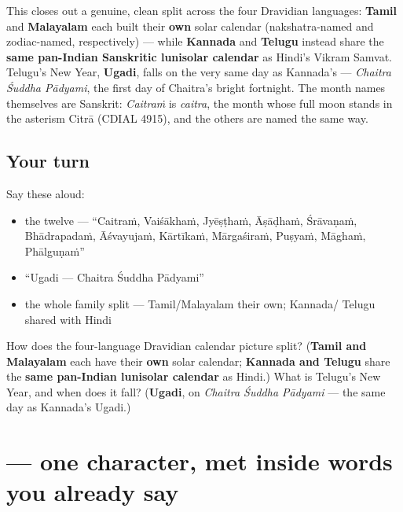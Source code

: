\begin{cousinweb}
This closes out a genuine, clean split across the four Dravidian languages: \textbf{Tamil} and \textbf{Malayalam} each built their \textbf{own} solar calendar (nakshatra-named and zodiac-named, respectively) — while \textbf{Kannada} and \textbf{Telugu} instead share the \textbf{same pan-Indian Sanskritic lunisolar calendar} as Hindi's Vikram Samvat. Telugu's New Year, \textbf{Ugadi}, falls on the very same day as Kannada's — \emph{Chaitra Śuddha Pādyami}, the first day of Chaitra's bright fortnight. The month names themselves are Sanskrit: \emph{Caitraṁ} is \emph{caitra}, the month whose full moon stands in the asterism Citrā (CDIAL 4915), and the others are named the same way.
\end{cousinweb}

\subsection*{Your turn}
Say these aloud:

\begin{itemize}
\raggedright
  \item the twelve — \textquotedblleft{}Caitraṁ, Vaiśākhaṁ, Jyēṣṭhaṁ, Āṣāḍhaṁ, Śrāvaṇaṁ, Bhādrapadaṁ, Āśvayujaṁ, Kārtīkaṁ, Mārgaśiraṁ, Puṣyaṁ, Māghaṁ, Phālguṇaṁ\textquotedblright{}
  \item \textquotedblleft{}Ugadi — Chaitra Śuddha Pādyami\textquotedblright{}
  \item the whole family split — Tamil/Malayalam their own; Kannada/ Telugu shared with Hindi
\end{itemize}

\begin{tcolorbox}[breakable,colback=teal!4,colframe=teal!35!black,title={Before you move on}]
How does the four-language Dravidian calendar picture split? (\textbf{Tamil and Malayalam} each have their \textbf{own} solar calendar; \textbf{Kannada and Telugu} share the \textbf{same pan-Indian lunisolar calendar} as Hindi.) What is Telugu's New Year, and when does it fall? (\textbf{Ugadi}, on \emph{Chaitra Śuddha Pādyami} — the same day as Kannada's Ugadi.)
\end{tcolorbox}
\section[\texorpdfstring{\te{ై} (ai)}{ై (ai)}]{ — one character, met inside words you already say}

\label{lesson:TE-S136-vowel-sign-ai}



